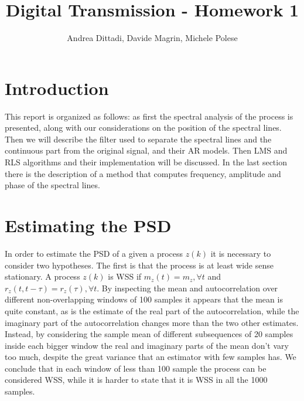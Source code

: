 \documentclass[10pt]{article}
\numberwithin{equation}{section}
\begin{document}
\title{Digital Transmission - Homework 1}
\author{Andrea Dittadi, Davide Magrin, Michele Polese}

\maketitle

\section*{Introduction}
This report is organized as follows: as first the spectral analysis of the process is presented, along with our considerations on the position of the spectral lines. Then we will describe the filter used to separate the spectral lines and the continuous part from the original signal, and their AR models. Then LMS and RLS algorithms and their implementation will be discussed. In the last section there is the description of a method that computes frequency, amplitude and phase of the spectral lines.

\section{Estimating the PSD}
In order to estimate the PSD of a given a process $z(k)$ it is necessary to consider two hypotheses. The first is that the process is at least wide sense stationary. A process $z(k)$ is WSS if $m_z(t) = m_z, \forall t$ and $r_z(t, t - \tau) = r_z(\tau), \forall t$. By inspecting the mean and autocorrelation over different non-overlapping windows of 100 samples it appears that the mean is quite constant, as is the estimate of the real part of the autocorrelation, while the imaginary part of the autocorrelation changes more than the two other estimates. Instead, by considering the sample mean of different subsequences of 20 samples inside each bigger window the real and imaginary parts of the mean don't vary too much, despite the great variance that an estimator with few samples has. We conclude that in each window of less than 100 sample the process can be considered WSS, while it is harder to state that it is WSS in all the 1000 samples.

\end{document}
